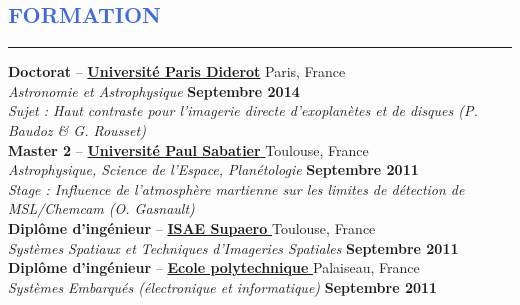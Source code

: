 \documentclass[11pt, a4paper, french]{article}
\begin{document}

\vspace{-0.3cm}
\textcolor{RoyalBlue}{\section{\large FORMATION}
\vspace{-0.2cm}\hrule}
\vspace{0.4cm}

{\bf Doctorat} -- \href{https://www.univ-paris-diderot.fr/}{\textbf{Universit\'e Paris Diderot}}
\hfill Paris, France\\
{\small \it Astronomie et Astrophysique} \hfill  {\small \bf Septembre 2014}\\
{\footnotesize
\it Sujet : Haut contraste pour l'imagerie directe d'exoplanètes et de disques (P. Baudoz \& G. Rousset)}\\


\vspace{-0.05cm}
{\bf Master 2} --
\href{http://ezomp2.omp.obs-mip.fr/asep/index.php/fre}{\textbf{Université Paul Sabatier} }
 \hfill Toulouse, France\\
{\small \it Astrophysique, Science de l'Espace, Planétologie} \hfill { \small \bf Septembre 2011}\\
{\footnotesize
\it Stage : Influence de l'atmosphère martienne sur les limites de détection de MSL/Chemcam (O. Gasnault)}\\

\vspace{-0.05cm}
{\bf Diplôme d'ingénieur} -- \href{https://www.isae-supaero.fr/}{\textbf{\textbf{ISAE Supaero} }}  \hfill Toulouse, France\\
{\small \it Systèmes Spatiaux et Techniques d'Imageries Spatiales} \hfill { \small \bf Septembre 2011}\\


\vspace{-0.05cm}
{\bf Diplôme d'ingénieur} --
\href{http://www.polytechnique.edu/}{\textbf{\textbf{Ecole polytechnique} }}
\hfill Palaiseau, France  \\
{\small \it Systèmes Embarqués (électronique et informatique)}   \hfill {\small \bf Septembre 2011}\\
\end{document}
